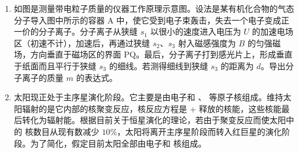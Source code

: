 \documentclass[\gkver]{gaokaozhenti}
\begin{document}
\begin{enumerate}
\item
如图是测量带电粒子质量的仪器工作原理示意图。设法是某有机化合物的气态分子导入图中所示的容器 A 中，使它受到电子束轰击，失去一个电子变成正一价的分子离子。分子离子从狭缝 $s_{1}$ 以很小的速度进入电压为 $U$ 的加速电场区（初速不计），加速后，再通过狭缝 $s_{2}$、$s_{3}$ 射入磁感强度为 $B$ 的匀强磁场，方向垂直于磁场区的界面 PQ。最后，分子离子打到感光片上，形成垂直于纸面而且平行于狭缝 $s_{3}$ 的细线。若测得细线到狭缝 $s_{3}$ 的距离为 $d$。导出分子离子的质量 $m$ 的表达式。



\item
太阳现正处于主序星演化阶段。它主要是由电子和 、 等原子核组成。维持太阳辐射的是它内部的核聚变反应，核反应方程是  + 释放的核能，这些核能最后转化为辐射能。根据目前关于恒星演化的理论，若由于聚变反应而使太阳中的  核数目从现有数减少 $10\%$，太阳将离开主序星阶段而转入红巨星的演化阶段。为了简化，假定目前太阳全部由电子和  核组成。


\end{enumerate}
\end{document}
